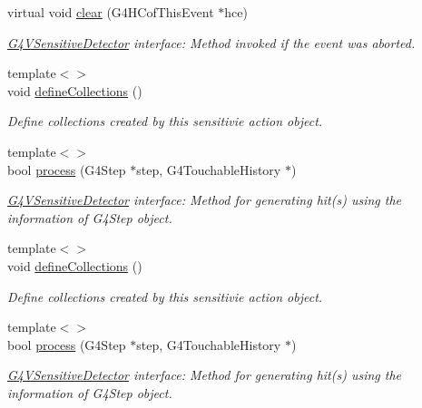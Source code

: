 \begin{DoxyCompactItemize}
virtual void \hyperlink{class_d_d4hep_1_1_simulation_1_1_geant4_sensitive_action_a52a9e46a54f3e1605637dc281a878b0d}{clear} (G4HCofThisEvent $\ast$hce)
\begin{DoxyCompactList}\small\item\em \hyperlink{class_g4_v_sensitive_detector}{G4VSensitiveDetector} interface: Method invoked if the event was aborted. \item\end{DoxyCompactList}\item 
{\footnotesize template$<$$>$ }\\void \hyperlink{class_d_d4hep_1_1_simulation_1_1_geant4_sensitive_action_a414ca0e288f6b1a298bebda417f5be18}{defineCollections} ()
\begin{DoxyCompactList}\small\item\em Define collections created by this sensitivie action object. \item\end{DoxyCompactList}\item 
{\footnotesize template$<$$>$ }\\bool \hyperlink{class_d_d4hep_1_1_simulation_1_1_geant4_sensitive_action_a126f9c3d065be1608935c5e16149cec3}{process} (G4Step $\ast$step, G4TouchableHistory $\ast$)
\begin{DoxyCompactList}\small\item\em \hyperlink{class_g4_v_sensitive_detector}{G4VSensitiveDetector} interface: Method for generating hit(s) using the information of G4Step object. \item\end{DoxyCompactList}\item 
{\footnotesize template$<$$>$ }\\void \hyperlink{class_d_d4hep_1_1_simulation_1_1_geant4_sensitive_action_a4c99ecfb911ff6828db0c98b331e2ca5}{defineCollections} ()
\begin{DoxyCompactList}\small\item\em Define collections created by this sensitivie action object. \item\end{DoxyCompactList}\item 
{\footnotesize template$<$$>$ }\\bool \hyperlink{class_d_d4hep_1_1_simulation_1_1_geant4_sensitive_action_aca71f1e67794a93cd1682101b5c110f9}{process} (G4Step $\ast$step, G4TouchableHistory $\ast$)
\begin{DoxyCompactList}\small\item\em \hyperlink{class_g4_v_sensitive_detector}{G4VSensitiveDetector} interface: Method for generating hit(s) using the information of G4Step object. \item\end{DoxyCompactList}\item 

\end{DoxyCompactItemize}
